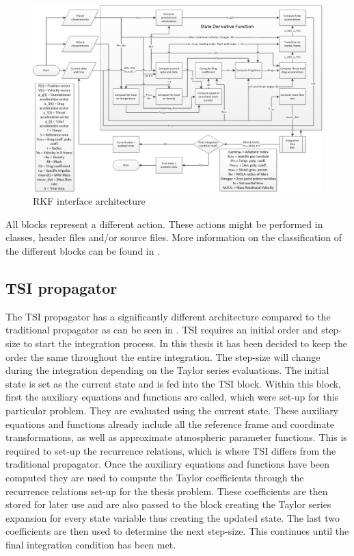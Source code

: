 \begin{figure}[!ht]
\centering
\includegraphics[width=1.5\textwidth, angle = 90]{figures/software/RK_Propagator.png}
\caption{\ac{RKF} interface architecture}
\label{fig:RK_Propagator}
\end{figure}

All blocks represent a different action. These actions might be performed in classes, header files and/or source files. More information on the classification of the different blocks can be found in .

\subsection{\ac{TSI} propagator}
\label{subsec:tsipropagator}
The \ac{TSI} propagator has a significantly different architecture compared to the traditional propagator as can be seen in . \ac{TSI} requires an initial order and step-size to start the integration process. In this thesis it has been decided to keep the order the same throughout the entire integration. The step-size will change during the integration depending on the Taylor series evaluations. The initial state is set as the current state and is fed into the \ac{TSI} block. Within this block, first the auxiliary equations and functions are called, which were set-up for this particular problem. They are evaluated using the current state. These auxiliary equations and functions already include all the reference frame and coordinate transformations, as well as approximate atmospheric parameter functions. This is required to set-up the recurrence relations, which is where \ac{TSI} differs from the traditional propagator. Once the auxiliary equations and functions have been computed they are used to compute the Taylor coefficients through the recurrence relations set-up for the thesis problem. These coefficients are then stored for later use and are also passed to the block creating the Taylor series expansion for every state variable thus creating the updated state. The last two coefficients are then used to determine the next step-size. This continues until the final integration condition has been met. 


